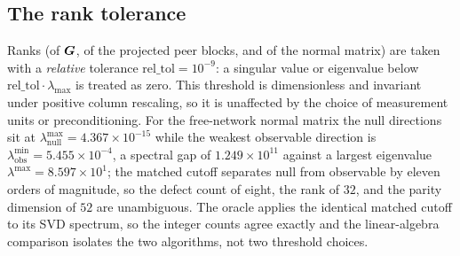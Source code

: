 \subsection{The rank tolerance}
\label{app:rank}

Ranks (of $\bm{G}$, of the projected peer blocks, and of the normal matrix) are taken with a
\emph{relative} tolerance $\text{rel\_tol}=10^{-9}$: a singular value or eigenvalue below
$\text{rel\_tol}\cdot\lambda_{\max}$ is treated as zero. This threshold is dimensionless and
invariant under positive column rescaling, so it is unaffected by the choice of measurement
units or preconditioning. For the free-network normal matrix the null directions sit at
$\lambda_{\text{null}}^{\max}=4.367\times10^{-15}$ while the weakest observable direction is
$\lambda_{\text{obs}}^{\min}=5.455\times10^{-4}$, a spectral gap of $1.249\times10^{11}$
against a largest eigenvalue $\lambda^{\max}=8.597\times10^{1}$; the matched cutoff separates
null from observable by eleven orders of magnitude, so the defect count of eight, the rank of
$32$, and the parity dimension of $52$ are unambiguous. The oracle applies the identical
matched cutoff to its SVD spectrum, so the integer counts agree exactly and the linear-algebra
comparison isolates the two algorithms, not two threshold choices.
